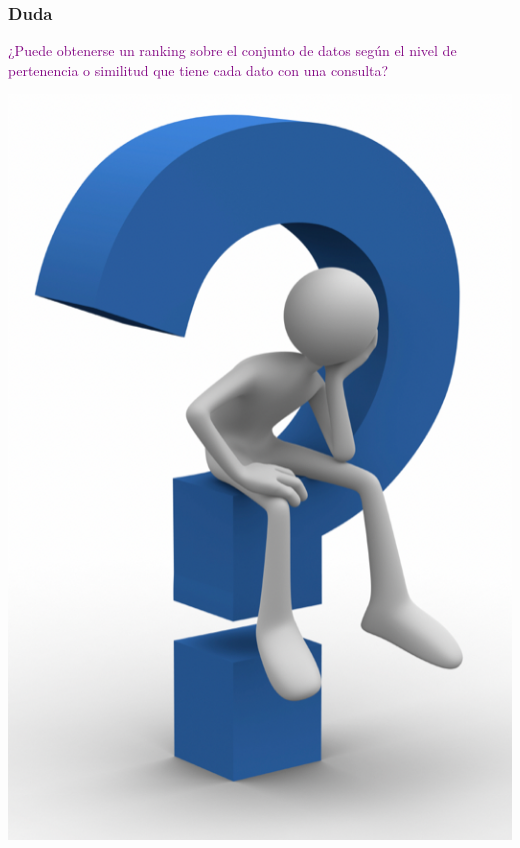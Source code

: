\documentclass[
10pt, %
aspectratio=169, %
]{beamer}
\begin{document}
	\begin{frame}
		
		\frametitle{Duda}
		
		\noindent\begin{minipage}{.4\textwidth}
			
			\textcolor{purple}{¿Puede obtenerse un ranking sobre el conjunto de datos según el nivel de pertenencia o similitud que tiene cada dato con una consulta?} 
			
			
		\end{minipage}%
		\begin{minipage}{.7\textwidth}
			\centering
			\includegraphics[scale=0.36]{duda.png} 
		\end{minipage}
		
	\end{frame}
	
\end{document}
